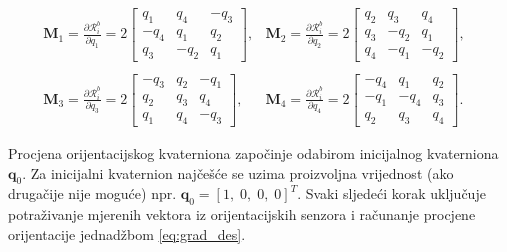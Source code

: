 \documentclass[times, utf8, diplomski, numeric]{templates/template}
\begin{document}
{{{{                \begin{equation}
                \begin{array}{rcl}
                    \boldsymbol{M}_1 = \frac{\partial \mathcal{R}_i^b}{\partial q_1} = 2
                    \begin{bmatrix}
                        q_1 & q_4 & -q_3 \\
                        -q_4 & q_1 & q_2 \\
                        q_3 & -q_2 & q_1 
                    \end{bmatrix},
                    & 
                    \boldsymbol{M}_2 = \frac{\partial \mathcal{R}_i^b}{\partial q_2} = 2
                    \begin{bmatrix}
                        q_2 & q_3 & q_4 \\
                        q_3 & -q_2 & q_1 \\
                        q_4 & -q_1 & -q_2 
                    \end{bmatrix},
                    \\
                    & & \\
                    \boldsymbol{M}_3 = \frac{\partial \mathcal{R}_i^b}{\partial q_3} = 2
                    \begin{bmatrix}
                        -q_3 & q_2 & -q_1 \\
                        q_2 & q_3 & q_4\\
                        q_1 & q_4 & -q_3 
                    \end{bmatrix},
                    & 
                    \boldsymbol{M}_4 = \frac{\partial \mathcal{R}_i^b}{\partial q_4} = 2
                    \begin{bmatrix}
                        -q_4 & q_1 & q_2 \\
                        -q_1 & -q_4 & q_3 \\
                        q_2 & q_3 & q_4 
                    \end{bmatrix}.
                \end{array}
                \end{equation}

                Procjena orijentacijskog kvaterniona započinje odabirom inicijalnog kvaterniona $\boldsymbol{q}_0$. Za inicijalni kvaternion najčešće se uzima proizvoljna vrijednost (ako drugačije nije moguće) npr. $\boldsymbol{q}_0 = \left[1, \; 0, \; 0, \; 0\right]^T$. Svaki sljedeći korak uključuje potraživanje mjerenih vektora iz orijentacijskih senzora i računanje procjene orijentacije jednadžbom \ref{eq:grad_des}.

}}}}
\end{document}
